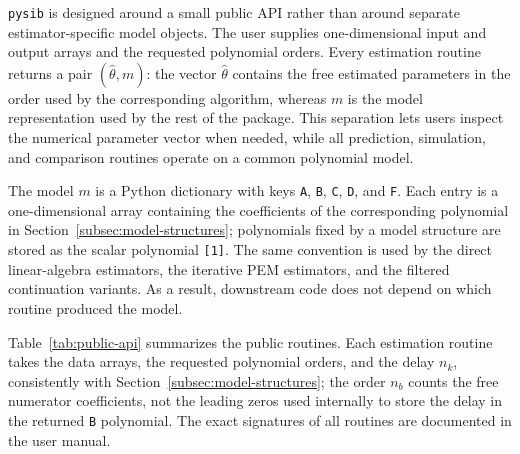 \documentclass[acmsmall,screen,review]{acmart}
\begin{document}
\texttt{pysib} is designed around a small public API rather than around
separate estimator-specific model objects.  The user supplies one-dimensional
input and output arrays and the requested polynomial orders.  Every estimation
routine returns a pair $(\hat\theta, m)$: the vector $\hat\theta$ contains the
free estimated parameters in the order used by the corresponding algorithm,
whereas $m$ is the model representation used by the rest of the package.  This
separation lets users inspect the numerical parameter vector when needed, while
all prediction, simulation, and comparison routines operate on a common
polynomial model.

The model $m$ is a Python dictionary with keys \texttt{A}, \texttt{B},
\texttt{C}, \texttt{D}, and \texttt{F}.  Each entry is a one-dimensional array
containing the coefficients of the corresponding polynomial in
Section~\ref{subsec:model-structures}; polynomials fixed by a model structure
are stored as the scalar polynomial \texttt{[1]}.  The same convention is used
by the direct linear-algebra estimators, the iterative PEM estimators, and the
filtered continuation variants.  As a result, downstream code does not depend on which
routine produced the model.

Table~\ref{tab:public-api} summarizes the public routines.  Each estimation
routine takes the data arrays, the requested polynomial orders, and the
delay \(n_k\), consistently with Section~\ref{subsec:model-structures}; the
order \(n_b\) counts the free numerator coefficients, not the leading zeros
used internally to store the delay in the returned \texttt{B} polynomial.
The exact signatures of all routines are documented in the user manual.
\end{document}
